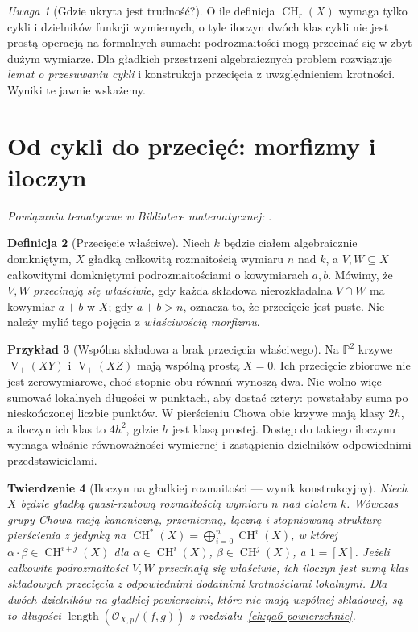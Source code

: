 \documentclass[11pt,a4paper,openany]{report}
\numberwithin{equation}{section}
\theoremstyle{plain}
\newtheorem{twierdzenie}{Twierdzenie}[section]
\theoremstyle{definition}
\newtheorem{definicja}[twierdzenie]{Definicja}
\newtheorem{przyklad}[twierdzenie]{Przykład}
\theoremstyle{remark}
\newtheorem{uwaga}[twierdzenie]{Uwaga}
\newcommand{\PP}{\mathbb P}
\newcommand{\V}{\operatorname V}
\begin{document}
\begin{uwaga}[Gdzie ukryta jest trudność?]
O ile definicja $\operatorname{CH}_r(X)$ wymaga tylko
cykli i dzielników funkcji wymiernych, o tyle iloczyn dwóch
klas cykli nie jest prostą operacją na formalnych sumach:
podrozmaitości mogą przecinać się w zbyt dużym wymiarze.
Dla gładkich przestrzeni algebraicznych problem rozwiązuje
\emph{lemat o przesuwaniu cykli} i konstrukcja przecięcia
z uwzględnieniem krotności. Wyniki te jawnie wskażemy.
\end{uwaga}

\section{Od cykli do przecięć: morfizmy i iloczyn}
\label{sec:ga7-intersection}

\noindent\emph{Powiązania tematyczne w Bibliotece matematycznej:} .


\begin{definicja}[Przecięcie właściwe]
\label{def:ga7-proper-intersection}
Niech $k$ będzie ciałem algebraicznie domkniętym,
$X$ gładką całkowitą rozmaitością wymiaru $n$ nad $k$,
a $V,W\subseteq X$ całkowitymi domkniętymi podrozmaitościami
o kowymiarach $a,b$. Mówimy, że $V,W$ \emph{przecinają się
właściwie}, gdy każda składowa nierozkładalna $V\cap W$
ma kowymiar $a+b$ w $X$; gdy $a+b>n$, oznacza to, że
przecięcie jest puste.
Nie należy mylić tego pojęcia z \emph{właściwością morfizmu}.
\end{definicja}

\begin{przyklad}[Wspólna składowa a brak przecięcia właściwego]
Na $\PP^2$ krzywe $\V_+(XY)$ i $\V_+(XZ)$
mają wspólną prostą $X=0$. Ich przecięcie zbiorowe
nie jest zerowymiarowe, choć stopnie obu równań wynoszą dwa.
Nie wolno więc sumować lokalnych długości w punktach,
aby dostać cztery: powstałaby suma po nieskończonej liczbie
punktów. W pierścieniu Chowa obie krzywe mają klasy $2h$,
a iloczyn ich klas to $4h^2$, gdzie $h$ jest klasą prostej.
Dostęp do takiego iloczynu wymaga właśnie równoważności
wymiernej i zastąpienia dzielników odpowiednimi przedstawicielami.
\end{przyklad}

\begin{twierdzenie}[Iloczyn na gładkiej rozmaitości — wynik konstrukcyjny]
\label{tw:ga7-chow-ring}
Niech $X$ będzie gładką quasi-rzutową rozmaitością
wymiaru $n$ nad ciałem $k$. Wówczas grupy Chowa mają kanoniczną, przemienną,
łączną i stopniowaną strukturę pierścienia z jedynką na
$\operatorname{CH}^*(X)=\bigoplus_{i=0}^n\operatorname{CH}^i(X)$,
w której $\alpha\cdot\beta\in\operatorname{CH}^{i+j}(X)$
dla $\alpha\in\operatorname{CH}^i(X)$,
$\beta\in\operatorname{CH}^j(X)$, a $1=[X]$.
Jeżeli całkowite podrozmaitości $V,W$ przecinają się
właściwie, ich iloczyn jest sumą klas składowych
przecięcia z odpowiednimi dodatnimi krotnościami
lokalnymi. Dla dwóch dzielników na gładkiej powierzchni,
które nie mają wspólnej składowej, są to długości
$\operatorname{length}(\mathcal O_{X,p}/(f,g))$ z
rozdziału~\ref{ch:ga6-powierzchnie}.
\end{twierdzenie}
\end{document}
